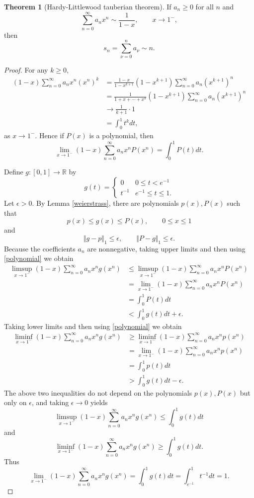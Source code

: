 \documentclass{article}
\newcommand{\norm}[1]{\Vert #1 \Vert}
\theoremstyle{definition}
\newtheorem{theorem}{Theorem}
\begin{document}
\begin{theorem}[Hardy-Littlewood tauberian theorem]
If $a_n \geq 0$ for all $n$ and 
\[
\sum_{n=0}^\infty a_n x^n \sim \frac{1}{1-x}, \qquad x \to 1^-,
\]
then
\[
s_n = \sum_{\nu=0}^n a_\nu \sim n.
\]
\end{theorem}
\begin{proof}
For any $k \geq 0$,
\begin{align*}
(1-x)\sum_{n=0}^\infty a_n x^n (x^n)^k&=\frac{1-x}{1-x^{k+1}} (1-x^{k+1}) \sum_{n=0}^\infty a_n (x^{k+1})^n\\
&= \frac{1}{1+x+\cdots+x^k} (1-x^{k+1}) \sum_{n=0}^\infty a_n (x^{k+1})^n\\
&\to \frac{1}{k+1} \cdot 1\\
&= \int_0^1 t^k dt,
\end{align*}
as $x \to 1^-$. Hence if $P(x)$ is a polynomial, then
\begin{equation}
\lim_{x \to 1^-} (1-x) \sum_{n=0}^\infty a_n x^n P(x^n) = \int_0^1 P(t) dt.
\label{polynomial}
\end{equation}



Define $g:[0,1] \to \mathbb{R}$ by
\[
g(t) = 
\begin{cases}
0&0 \leq t <e^{-1}\\
t^{-1}&e^{-1} \leq t \leq 1.
\end{cases}
\]
Let $\epsilon>0$.
By Lemma \ref{weierstrass}, there are polynomials $p(x), P(x)$ such that 
\[
p(x) \leq g(x) \leq P(x), \qquad 0 \leq x \leq 1
\]
and
\[
\norm{g-p}_1 \leq \epsilon, \qquad \norm{P-g}_1 \leq \epsilon.
\]
Because the coefficients $a_n$ are nonnegative, taking upper limits and then using \eqref{polynomial} we obtain
\begin{align*}
\limsup_{x \to 1^-} (1-x)\sum_{n=0}^\infty a_n x^n g(x^n)&\leq
\limsup_{x \to 1^-} (1-x)\sum_{n=0}^\infty a_n x^n P(x^n)\\
&=\lim_{x \to 1^-} (1-x)\sum_{n=0}^\infty a_n x^n P(x^n)\\
&=\int_0^1 P(t) dt\\
&<\int_0^1 g(t) dt + \epsilon.
\end{align*}
Taking lower limits and then using \eqref{polynomial} we obtain
\begin{align*}
\liminf_{x \to 1^-} (1-x)\sum_{n=0}^\infty a_n x^n g(x^n)&\geq
\liminf_{x \to 1^-} (1-x)\sum_{n=0}^\infty a_n x^n p(x^n)\\
&=\lim_{x \to 1^-} (1-x)\sum_{n=0}^\infty a_n x^n p(x^n)\\
&=\int_0^1 p(t) dt\\
&>\int_0^1 g(t) dt - \epsilon.
\end{align*}
The above two inequalities do not depend on the polynomials $p(x),P(x)$ but only on $\epsilon$, and
taking $\epsilon \to 0$ yields
\[
\limsup_{x \to 1^-} (1-x)\sum_{n=0}^\infty a_n x^n g(x^n) \leq \int_0^1 g(t) dt
\]
and
\[
\liminf_{x \to 1^-} (1-x)\sum_{n=0}^\infty a_n x^n g(x^n) \geq \int_0^1 g(t) dt.
\]
Thus
\begin{equation}
\lim_{x \to 1^-} (1-x)\sum_{n=0}^\infty a_n x^n g(x^n) = \int_0^1 g(t) dt
= \int_{e^{-1}}^1 t^{-1} dt = 1.
\label{glimit}
\end{equation}


\end{proof}
\end{document}
